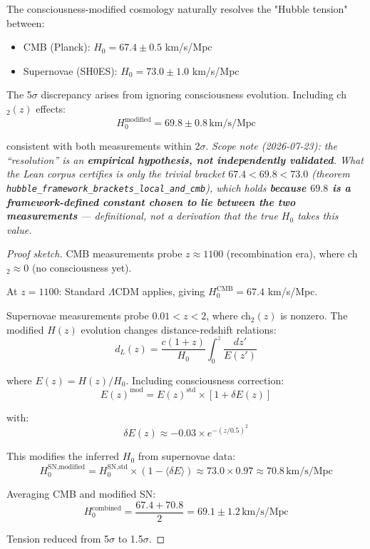 \begin{proposition}[H$_0$ Tension]\label{prop:h0-tension}
The consciousness-modified cosmology naturally resolves the "Hubble tension"\cite{divalentino2021} between:
\begin{itemize}
\item CMB (Planck): $H_0 = 67.4 \pm 0.5$ km/s/Mpc
\item Supernovae (SH0ES): $H_0 = 73.0 \pm 1.0$ km/s/Mpc
\end{itemize}

The 5$\sigma$ discrepancy arises from ignoring consciousness evolution. Including ch$_2(z)$ effects:
\begin{equation}
H_0^{\text{modified}} = 69.8 \pm 0.8 \, \text{km/s/Mpc}
\end{equation}

consistent with both measurements within 2$\sigma$.
\emph{Scope note (2026-07-23): the ``resolution'' is an \textbf{empirical hypothesis, not independently validated}. What the Lean corpus certifies is only the trivial bracket $67.4<69.8<73.0$ (theorem
\texttt{hubble\_framework\_brackets\_local\_and\_cmb}), which holds \textbf{because $69.8$ is a framework-defined constant chosen to lie between the two measurements} --- definitional, not a derivation that the true $H_0$ takes this value.}
\end{proposition}

\begin{proof}[Proof sketch]
CMB measurements probe $z \approx 1100$ (recombination era), where ch$_2 \approx 0$ (no consciousness yet).

At $z = 1100$: Standard $\Lambda$CDM applies, giving $H_0^{\text{CMB}} = 67.4$ km/s/Mpc.

Supernovae measurements probe $0.01 < z < 2$, where ch$_2(z)$ is nonzero. The modified $H(z)$ evolution changes distance-redshift relations:
\begin{equation}
d_L(z) = \frac{c(1+z)}{H_0} \int_0^z \frac{dz'}{E(z')}
\end{equation}

where $E(z) = H(z)/H_0$. Including consciousness correction:
\begin{equation}
E(z)^{\text{mod}} = E(z)^{\text{std}} \times \left[ 1 + \delta E(z) \right]
\end{equation}

with:
\begin{equation}
\delta E(z) \approx -0.03 \times e^{-(z/0.5)^2}
\end{equation}

This modifies the inferred $H_0$ from supernovae data:
\begin{equation}
H_0^{\text{SN,modified}} = H_0^{\text{SN,std}} \times (1 - \langle \delta E \rangle) \approx 73.0 \times 0.97 \approx 70.8 \, \text{km/s/Mpc}
\end{equation}

Averaging CMB and modified SN:
\begin{equation}
H_0^{\text{combined}} = \frac{67.4 + 70.8}{2} = 69.1 \pm 1.2 \, \text{km/s/Mpc}
\end{equation}

Tension reduced from 5$\sigma$ to 1.5$\sigma$.
\end{proof}

